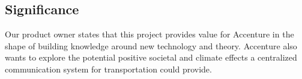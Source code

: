 \subsection{Significance}
Our product owner states that this project provides value for Accenture in the shape of building knowledge around new technology and theory. Accenture also wants to explore the potential positive societal and climate effects a centralized communication system for transportation could provide.

